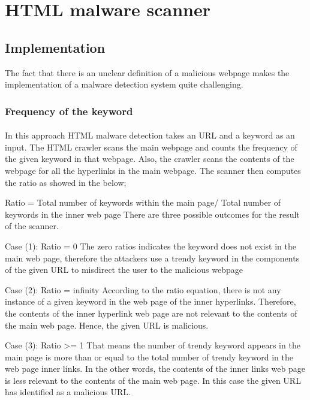 \section{HTML malware scanner}

\subsection{Implementation}
The fact that there is an unclear definition of a malicious webpage makes the implementation of a malware detection system quite challenging. 	  
	

\subsubsection{Frequency of the keyword}

\paragraph{} 
In this approach HTML malware detection takes an URL and a keyword as an input. The HTML crawler scans the main webpage and counts the frequency of the given keyword in that webpage. Also, the crawler scans the contents of the webpage for all the hyperlinks in the main webpage. The scanner then computes the ratio as showed in the below;

Ratio = Total number of keywords within the main page/ Total number of keywords in the inner web page 
There are three possible outcomes for the result of the scanner. 

Case (1): Ratio = 0
The zero ratios indicates the keyword does not exist in the main web page, therefore the attackers use a trendy keyword in the components of the given URL to misdirect the user to the malicious webpage

Case (2): Ratio = infinity
According to the ratio equation, there is not any instance of a given keyword in the web page of the inner hyperlinks. Therefore, the contents of the inner hyperlink web page are not relevant to the contents of the main web page. Hence, the given URL is malicious.

Case (3): Ratio >= 1
That means the number of trendy keyword appears in the main page is more than or equal to the total number of trendy keyword in the web page inner links. In the other words, the contents of the inner links web page is less relevant to the contents of the main web page. In this case the given URL has identified as a malicious URL. 


